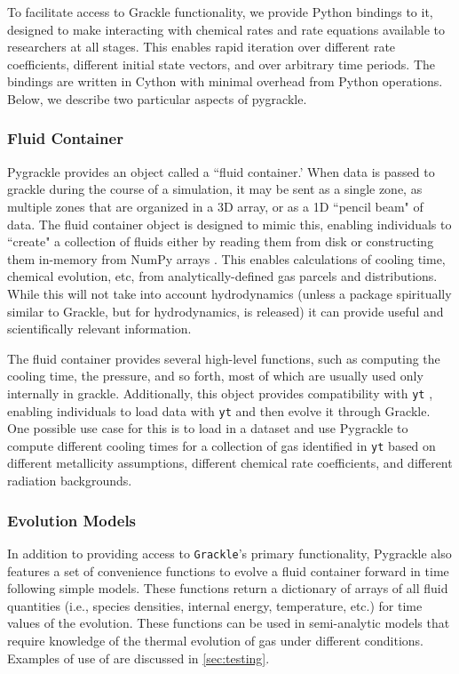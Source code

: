To facilitate access to Grackle functionality, we provide Python bindings to
it, designed to make interacting with chemical rates and rate equations
available to researchers at all stages.  This enables rapid iteration over
different rate coefficients, different initial state vectors, and over
arbitrary time periods.  The bindings are written in Cython
\citep{behnel2010cython} with minimal overhead from Python operations.  Below,
we describe two particular aspects of pygrackle.

\subsubsection{Fluid Container} \label{sec:pyfluid}

Pygrackle provides an object called a ``fluid container.'  When data is passed
to grackle during the course of a simulation, it may be sent as a single zone,
as multiple zones that are organized in a 3D array, or as a 1D ``pencil beam" of
data.  The fluid container object is designed to mimic this, enabling
individuals to ``create" a collection of fluids either by reading them from
disk or constructing them in-memory from NumPy arrays \citep{numpy}.  This
enables calculations of cooling time, chemical evolution, etc, from
analytically-defined gas parcels and distributions.  While this will not take
into account hydrodynamics (unless a package spiritually similar to Grackle,
but for hydrodynamics, is released) it can provide useful and scientifically
relevant information.

The fluid container provides several high-level functions, such as computing
the cooling time, the pressure, and so forth, most of which are usually used
only internally in grackle.  Additionally, this object provides compatibility
with \texttt{yt} \citep{2011ApJS..192....9T}, enabling individuals to load data
with \texttt{yt} and then evolve it through Grackle.  One possible use case for
this is to load in a dataset and use Pygrackle to compute different cooling
times for a collection of gas identified in \texttt{yt} based on different
metallicity assumptions, different chemical rate coefficients, and different
radiation backgrounds.

\subsubsection{Evolution Models} \label{sec:pyevolve}

In addition to providing access to \texttt{Grackle}'s primary
functionality, Pygrackle also features a set of convenience functions
to evolve a fluid container forward in time following simple models.
These functions return a dictionary of arrays of all fluid quantities
(i.e., species densities, internal energy, temperature, etc.) for time
values of the evolution.  These functions can be used in semi-analytic
models that require knowledge of the thermal evolution of gas under
different conditions.  Examples of use of are discussed in
\ref{sec:testing}.

